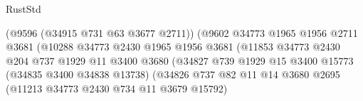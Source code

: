 \begin{lexlean}{RustStd}
\begin{coremodule}
{\begin{coremodule}
{{{{{{{{{{{{{{{{{{{{{{{{{{{{{{{{{{{{{{{{{{{{{{{{{{{{{{{                                                (@9596 (@34915 @731 @63 @3677 @2711))
                                                (@9602
                                                  @34773
                                                  @1965
                                                  @1956
                                                  @2711
                                                  @3681
                                                  (@10288
                                                    @34773
                                                    @2430
                                                    @1965
                                                    @1956
                                                    @3681
                                                    (@11853
                                                      @34773
                                                      @2430
                                                      @204
                                                      @737
                                                      @1929
                                                      @11
                                                      @3400
                                                      @3680
                                                      (@34827
                                                        @739
                                                        @1929
                                                        @15
                                                        @3400
                                                        @15773
                                                        (@34835 @3400 @34838 @13738)
                                                        (@34826
                                                          @737
                                                          @82
                                                          @11
                                                          @14
                                                          @3680
                                                          @2695
                                                          (@11213
                                                            @34773
                                                            @2430
                                                            @734
                                                            @11
                                                            @3679
                                                            @15792)
}}}}}}}}}}}}}}}}}}}}}}}}}}}}}}}}}}}}}}}}}}}}}}}}}}}}}}}
\end{coremodule}}
\end{coremodule}
\end{lexlean}
